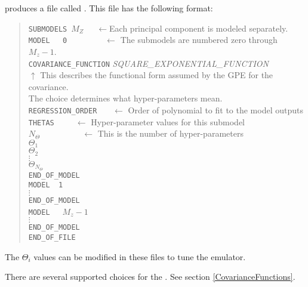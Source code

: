  produces a file called . This file has the following format:
\begin{quote}
{\tt SUBMODELS}~$M_Z$~~~$\leftarrow$Each principal component is modeled separately.\\
{\tt MODEL~~~0}~~~~~~~~~$\leftarrow$ The submodels are numbered zero through $M_z-1$.\\
{\tt COVARIANCE\_FUNCTION} {\it SQUARE\_EXPONENTIAL\_FUNCTION}\\
$\uparrow$ This describes the  functional form assumed by the GPE for the covariance.\\
The choice determines what hyper-parameters mean.\\
{\tt REGRESSION\_ORDER }~~ $\leftarrow$ Order of polynomial to fit to the model outputs\\
{\tt THETAS}~~~~~$\leftarrow$ Hyper-parameter values for this submodel\\
$N_\Theta$~~~~~~~~~~$\leftarrow$ This is the number of hyper-parameters\\
$\Theta_1$\\
$\Theta_2$\\
$\vdots$\\
$\Theta_{N_\Theta}$\\
{\tt END\_OF\_MODEL}\\
{\tt MODEL~~1}\\
$\vdots$\\
{\tt END\_OF\_MODEL}\\
{\tt MODEL}~~~{$M_z-1$}\\
$\vdots$\\
{\tt END\_OF\_MODEL}\\
{\tt END\_OF\_FILE}
\end{quote}\vspace*{-8pt}

The $\Theta_i$ values can be modified in these files to tune the emulator.

There are several supported choices for the . See section \ref{CovarianceFunctions}.
